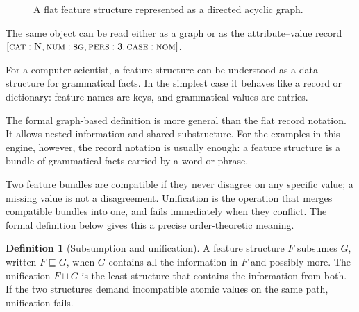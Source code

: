 \documentclass[11pt]{article}
\theoremstyle{definition}
\newtheorem{definition}{Definition}[section]
\theoremstyle{plain}
\theoremstyle{remark}
\begin{document}
\begin{figure}[h]
\centering
{}
\caption{A flat feature structure represented as a directed acyclic graph.}
\end{figure}

The same object can be read either as a graph or as the attribute--value record
\([\textsc{cat}:\textsc{N}, \textsc{num}:\textsc{sg},
\textsc{pers}:3, \textsc{case}:\textsc{nom}]\).

For a computer scientist, a feature structure can be understood as a data
structure for grammatical facts. In the simplest case it behaves like a record
or dictionary: feature names are keys, and grammatical values are entries.

The formal graph-based definition is more general than the flat record notation. It
allows nested information and shared substructure. For the examples in this
engine, however, the record notation is usually enough: a feature structure is
a bundle of grammatical facts carried by a word or phrase.

Two feature bundles are compatible if they never disagree on any specific value; a missing
value is not a disagreement. Unification is the operation that merges compatible bundles
into one, and fails immediately when they conflict. The formal definition below gives this
a precise order-theoretic meaning.

\begin{definition}[Subsumption and unification]
A feature structure $F$ subsumes $G$, written $F \sqsubseteq G$, when $G$
contains all the information in $F$ and possibly more. The unification
$F \sqcup G$ is the least structure that contains the information from both. If
the two structures demand incompatible atomic values on the same path,
unification fails.
\end{definition}
\end{document}
